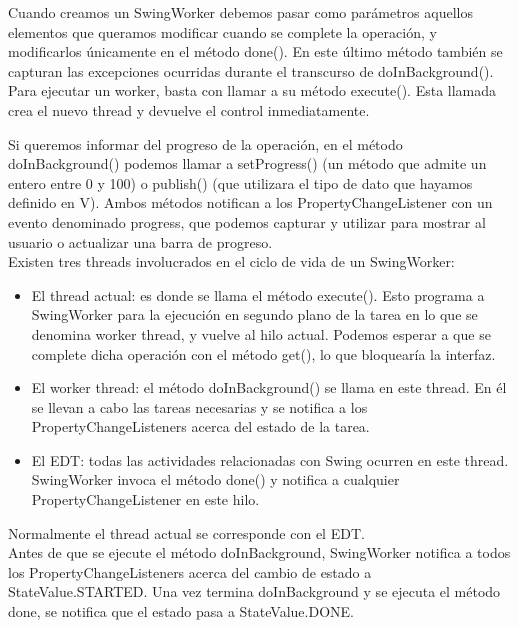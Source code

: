 \documentclass[12pt, a4paper]{book}
\begin{document}
 Cuando creamos un SwingWorker debemos pasar como parámetros aquellos elementos que queramos modificar cuando se complete la operación, y modificarlos únicamente en el método done(). En este último método también se capturan las excepciones ocurridas durante el transcurso de doInBackground().\\
 
 Para ejecutar un worker, basta con llamar a su método execute(). Esta llamada crea el nuevo thread y devuelve el control inmediatamente.
 
 \newpage
 
Si queremos informar del progreso de la operación, en el método doInBackground() podemos llamar a setProgress() (un método que admite un entero entre 0 y 100) o publish() (que utilizara el tipo de dato que hayamos definido en V). Ambos métodos notifican a los PropertyChangeListener con un evento denominado progress, que podemos capturar y utilizar para mostrar al usuario o actualizar una barra de progreso.\\


Existen tres threads involucrados en el ciclo de vida de un SwingWorker:

\begin{itemize}
	\item El thread actual: es donde se llama el método execute(). Esto programa a SwingWorker para la ejecución en segundo plano de la tarea en lo que se denomina worker thread, y vuelve al hilo actual. Podemos esperar a que se complete dicha operación con el método get(), lo que bloquearía la interfaz.
	\item El worker thread: el método doInBackground() se llama en este thread. En él se llevan a cabo las tareas necesarias y se notifica a los PropertyChangeListeners acerca del estado de la tarea.
	\item El \gls{EDT}: todas las actividades relacionadas con Swing ocurren en este thread. SwingWorker invoca el método done() y notifica a cualquier PropertyChangeListener en este hilo.
\end{itemize}

Normalmente el thread actual se corresponde con el \gls{EDT}.\\

Antes de que se ejecute el método doInBackground, SwingWorker notifica a todos los PropertyChangeListeners acerca del cambio de estado a StateValue.STARTED. Una vez termina doInBackground y se ejecuta el método done, se notifica que el estado pasa a StateValue.DONE.\\
\end{document}
